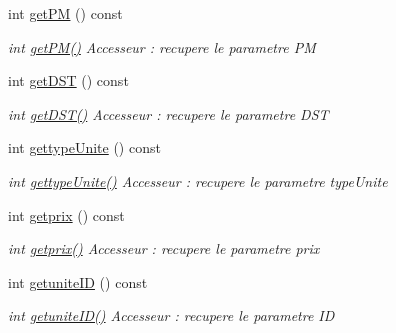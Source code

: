 \begin{DoxyCompactItemize}
\mbox{\label{classUnite_a6cea4cbc4f96d37904fc4c681d6e37f9}} 
int \hyperlink{classUnite_a6cea4cbc4f96d37904fc4c681d6e37f9}{get\+PM} () const
\begin{DoxyCompactList}\small\item\em int \hyperlink{classUnite_a6cea4cbc4f96d37904fc4c681d6e37f9}{get\+P\+M()} Accesseur \+: recupere le parametre PM \end{DoxyCompactList}\item 
\mbox{\label{classUnite_a035c0014e71c8da7675ab925e0473377}} 
int \hyperlink{classUnite_a035c0014e71c8da7675ab925e0473377}{get\+D\+ST} () const
\begin{DoxyCompactList}\small\item\em int \hyperlink{classUnite_a035c0014e71c8da7675ab925e0473377}{get\+D\+S\+T()} Accesseur \+: recupere le parametre D\+ST \end{DoxyCompactList}\item 
\mbox{\label{classUnite_a724be61ce1596594065e3994be597f97}} 
int \hyperlink{classUnite_a724be61ce1596594065e3994be597f97}{gettype\+Unite} () const
\begin{DoxyCompactList}\small\item\em int \hyperlink{classUnite_a724be61ce1596594065e3994be597f97}{gettype\+Unite()} Accesseur \+: recupere le parametre type\+Unite \end{DoxyCompactList}\item 
\mbox{\label{classUnite_a0f6e88099a2d2d418ab26d0486e1a292}} 
int \hyperlink{classUnite_a0f6e88099a2d2d418ab26d0486e1a292}{getprix} () const
\begin{DoxyCompactList}\small\item\em int \hyperlink{classUnite_a0f6e88099a2d2d418ab26d0486e1a292}{getprix()} Accesseur \+: recupere le parametre prix \end{DoxyCompactList}\item 
\mbox{\label{classUnite_a8653c444bdbb24628c9b5c8d9689d8db}} 
int \hyperlink{classUnite_a8653c444bdbb24628c9b5c8d9689d8db}{getunite\+ID} () const
\begin{DoxyCompactList}\small\item\em int \hyperlink{classUnite_a8653c444bdbb24628c9b5c8d9689d8db}{getunite\+I\+D()} Accesseur \+: recupere le parametre ID \end{DoxyCompactList}\item 

\end{DoxyCompactItemize}
